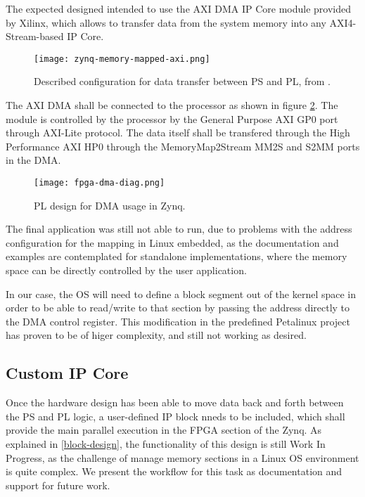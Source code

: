 The expected designed intended to use the AXI DMA IP Core module provided by Xilinx, which allows to
transfer data from the system memory into any AXI4-Stream-based IP Core.

\begin{figure}[htp]
	\centering
	\texttt{[image: zynq-memory-mapped-axi.png]}
	\caption{Described configuration for data transfer between PS and PL, from \cite{UG1046}.}
	\label{fig:zynq-memory-mapped-axi}
\end{figure}

The AXI DMA shall be connected to the processor as shown in figure \ref{fig:fpga-dma-diag}. The
module is controlled by the processor by the General Purpose AXI GP0 port through AXI-Lite protocol.
The data itself shall be transfered through the High Performance AXI HP0 through the
MemoryMap2Stream MM2S and S2MM ports in the DMA.

\begin{figure}[htp]
	\centering
	\texttt{[image: fpga-dma-diag.png]}
	\caption{PL design for DMA usage in Zynq.}
	\label{fig:fpga-dma-diag}
\end{figure}

The final application was still not able to run, due to problems with the address configuration for
the mapping in Linux embedded, as the documentation and examples are contemplated for standalone
implementations, where the memory space can be directly controlled by the user application.

In our case, the OS will need to define a block segment out of the kernel space in order to be able
to read/write to that section by passing the address directly to the DMA control register. This
modification in the predefined Petalinux project has proven to be of higer complexity, and still not
working as desired.

\subsection{Custom IP Core} \label{custom-ip-core}

Once the hardware design has been able to move data back and forth between the PS and PL logic, a
user-defined IP block nneds to be included, which shall provide the main parallel execution in the
FPGA section of the Zynq. As explained in \ref{block-design}, the functionality of this design is
still Work In Progress, as the challenge of manage memory sections in a Linux OS environment is
quite complex. We present the workflow for this task as documentation and support for future work.


